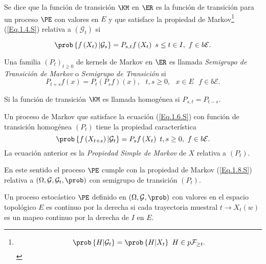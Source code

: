 Se dice que la funci\'on de transici\'on $\KM$ en $\ER$ es la
funci\'on de transici\'on para un proceso $\PE$  con valores en
$E$ y que satisface la propiedad de
Markov\footnote{\begin{equation}\label{Eq.1.4.S}
\prob\left\{H|\mathcal{G}_{t}\right\}=\prob\left\{H|X_{t}\right\}\textrm{
}H\in p\mathcal{F}_{\geq t}.
\end{equation}} (\ref{Eq.1.4.S}) relativa a $\left(\mathcal{G}_{t}\right)$ si

\begin{equation}\label{Eq.1.6.S}
\prob\left\{f\left(X_{t}\right)|\mathcal{G}_{s}\right\}=P_{s,t}f\left(X_{t}\right)\textrm{
}s\leq t\in I,\textrm{ }f\in b\mathcal{E}.
\end{equation}

\begin{Def}
Una familia $\left(P_{t}\right)_{t\geq0}$ de kernels de Markov en
$\ER$ es llamada {\em Semigrupo de Transici\'on de Markov} o {\em
Semigrupo de Transici\'on} si
\[P_{t+s}f\left(x\right)=P_{t}\left(P_{s}f\right)\left(x\right),\textrm{ }t,s\geq0,\textrm{ }x\in E\textrm{ }f\in b\mathcal{E}.\]
\end{Def}
\begin{Note}
Si la funci\'on de transici\'on $\KM$ es llamada homog\'enea si
$P_{s,t}=P_{t-s}$.
\end{Note}

Un proceso de Markov que satisface la ecuaci\'on (\ref{Eq.1.6.S})
con funci\'on de transici\'on homog\'enea $\left(P_{t}\right)$
tiene la propiedad caracter\'istica
\begin{equation}\label{Eq.1.8.S}
\prob\left\{f\left(X_{t+s}\right)|\mathcal{G}_{t}\right\}=P_{s}f\left(X_{t}\right)\textrm{
}t,s\geq0,\textrm{ }f\in b\mathcal{E}.
\end{equation}
La ecuaci\'on anterior es la {\em Propiedad Simple de Markov} de
$X$ relativa a $\left(P_{t}\right)$.

En este sentido el proceso $\PE$ cumple con la propiedad de Markov
(\ref{Eq.1.8.S}) relativa a
$\left(\Omega,\mathcal{G},\mathcal{G}_{t},\prob\right)$ con
semigrupo de transici\'on $\left(P_{t}\right)$.

\begin{Def}
Un proceso estoc\'astico $\PE$ definido en
$\left(\Omega,\mathcal{G},\prob\right)$ con valores en el espacio
topol\'ogico $E$ es continuo por la derecha si cada trayectoria
muestral $t\rightarrow X_{t}\left(w\right)$ es un mapeo continuo
por la derecha de $I$ en $E$.
\end{Def}

